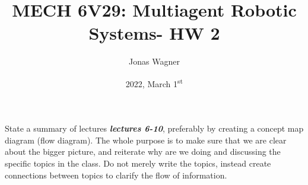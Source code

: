 \documentclass[]{article}
\title{MECH 6V29: Multiagent Robotic Systems- HW 2}
\author{Jonas Wagner}
\date{2022, March 1\textsuperscript{st}}
\numberwithin{equation}{section}
\begin{document}
	

\maketitle

\tableofcontents


\newpage
\section{}
State a summary of lectures \emph{\textbf{lectures 6-10}}, preferably by creating a concept map diagram (flow diagram). 
The whole purpose is to make sure that we are clear about the bigger picture, 
and reiterate why are we doing and discussing the specific topics in the class. 
Do not merely write the topics, instead create connections between topics to clarify the flow of information.
\end{document}
